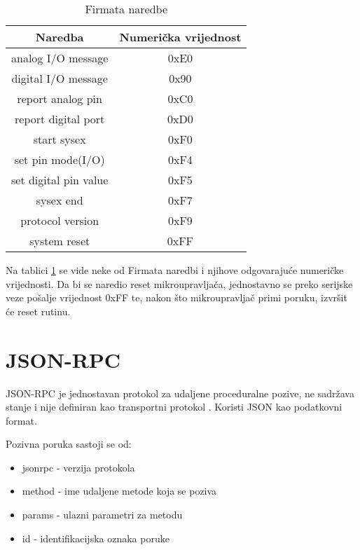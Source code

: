 \begin{table}[h]
\caption{Firmata naredbe}
\setlength{\tabcolsep}{18pt}
\centering
    \begin{tabular}{|c|c|}
        \hline
        Naredba               & Numerička vrijednost \\
        \hline
        analog I/O message    & 0xE0 \\
        \hline
        digital I/O message   & 0x90 \\
        \hline
        report analog pin     & 0xC0 \\
        \hline
        report digital port   & 0xD0 \\
        \hline
        start sysex           & 0xF0 \\
        \hline
        set pin mode(I/O)     & 0xF4 \\
        \hline
        set digital pin value & 0xF5 \\
        \hline
        sysex end             & 0xF7 \\
        \hline
        protocol version      & 0xF9 \\
        \hline
        system reset          & 0xFF \\
        \hline
    \end{tabular}
    \label{tbl:firmata}
\end{table}

Na tablici \ref{tbl:firmata} se vide neke od Firmata naredbi i njihove
odgovarajuće numeričke vrijednosti. Da bi se naredio reset mikroupravljača,
jednostavno se preko serijske veze pošalje vrijednost 0xFF te, nakon što
mikroupravljač primi poruku, izvršit će reset rutinu.

\newpage
\section{JSON-RPC}

JSON-RPC je jednostavan protokol za udaljene proceduralne pozive, ne sadržava
stanje i nije definiran kao transportni protokol \cite{jsonRPC}. Koristi JSON
\cite{jsonRFC} kao podatkovni format.

Pozivna poruka sastoji se od:
\begin{itemize}
        \item jsonrpc - verzija protokola
        \item method - ime udaljene metode koja se poziva
        \item params - ulazni parametri za metodu
        \item id - identifikacijska oznaka poruke
\end{itemize}


